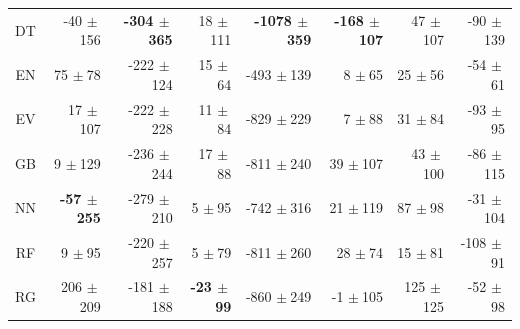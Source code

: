 \begin{table}[htb]
\begin{tabular}{crrrrrrr}
DT   & -40 $\pm~$156                                        & \textbf{-304 $\pm~$365}               & 18 $\pm~$111                                         & \textbf{-1078 $\pm~$359}             & \textbf{-168 $\pm~$107}                                         & 47 $\pm~$107                                             & -90 $\pm~$139                                                \\
EN    & 75 $\pm~$78                                         & -222 $\pm~$124               & 15 $\pm~$64                                         & -493 $\pm~$139              & 8 $\pm~$65                                            & 25 $\pm~$56                                              & -54 $\pm~$61                                                \\
EV  & 17 $\pm~$107                                         & -222 $\pm~$228               & 11 $\pm~$84                                         & -829 $\pm~$229              & 7 $\pm~$88                                            & 31 $\pm~$84                                              & -93 $\pm~$95                                                \\
GB & 9 $\pm~$129                                         & -236 $\pm~$244               & 17 $\pm~$88                                         & -811 $\pm~$240              & 39 $\pm~$107                                           & 43 $\pm~$100                                             & -86 $\pm~$115                                                \\
NN   & \textbf{-57 $\pm~$255}                                        & -279 $\pm~$210               & 5 $\pm~$95                                          & -742 $\pm~$316              & 21 $\pm~$119                                           & 87 $\pm~$98                                              & -31 $\pm~$104                                                \\
RF   & 9 $\pm~$95                                          & -220 $\pm~$257               & 5 $\pm~$79                                          & -811 $\pm~$260              & 28 $\pm~$74                                           & 15 $\pm~$81                                              & -108 $\pm~$91                                                \\
RG       & 206 $\pm~$209                                        & -181 $\pm~$188               & \textbf{-23 $\pm~$99}                                         & -860 $\pm~$249              & -1 $\pm~$105                                           & 125 $\pm~$125                                             & -52 $\pm~$98                                                \\

\end{tabular}
\end{table}
